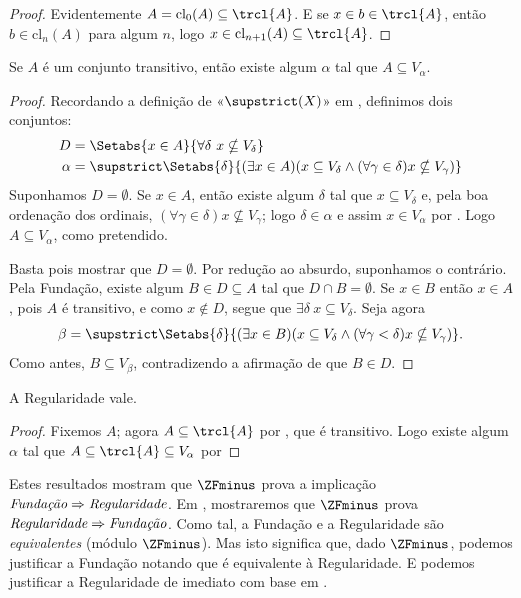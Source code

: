 \documentclass[../../../include/open-logic-section]{subfiles}
\begin{document}
\begin{proof}
Evidentemente $A = \text{cl}_0(A) \subseteq \trcl{A}$. E se $x
\in b \in \trcl{A}$, então $b \in \text{cl}_n(A)$ para algum $n$, logo $x
\in \text{cl}_{n+1}(A) \subseteq \trcl{A}$. 
\end{proof}

\begin{lem}
Se $A$ é um conjunto transitivo, então existe algum $\alpha$ tal que $A
\subseteq V_\alpha$.
\end{lem}

\begin{proof}
Recordando a definição de «$\supstrict(X)$» em
, definimos dois conjuntos:
\begin{align*}
	D  &= \Setabs{x \in A}{\forall \delta\ x \nsubseteq V_\delta}\\
	\alpha &= \supstrict\Setabs{\delta}{(\exists x \in A)
	(x \subseteq V_\delta \land (\forall \gamma \in \delta)x \nsubseteq V_\gamma)}
\end{align*}
Suponhamos $D = \emptyset$. Se $x \in A$, então existe algum $\delta$ tal que $x \subseteq V_\delta$ e, pela boa ordenação dos ordinais, $(\forall \gamma \in \delta)x \nsubseteq V_\gamma$; logo $\delta \in \alpha$ e assim $x \in V_\alpha$ por
. Logo $A \subseteq
V_{\alpha}$, como pretendido. 

Basta pois mostrar que $D = \emptyset$. Por redução ao absurdo, suponhamos
o contrário. Pela Fundação, existe algum $B \in D \subseteq A$ tal que $D \cap B
= \emptyset$. Se $x \in B$ então $x \in A$, pois $A$ é transitivo,
e como $x \notin D$, segue que $\exists \delta\ x \subseteq
V_\delta$. Seja agora
\[
	\beta = \supstrict\Setabs{\delta}{(\exists x \in B)(x \subseteq V_\delta \land (\forall \gamma < \delta)x \nsubseteq V_\gamma)}.
\]
Como antes, $B \subseteq V_\beta$, contradizendo a afirmação de que $B \in
D$.	
\end{proof}

\begin{thm}
A Regularidade vale.
\end{thm}

\begin{proof}
Fixemos $A$; agora $A \subseteq \trcl{A}$ por , que é transitivo. Logo existe algum $\alpha$ tal que $A \subseteq \trcl{A} \subseteq V_\alpha$ por 
\end{proof}

Estes resultados mostram que $\ZFminus$ prova a implicação
$\emph{Fundação}\Rightarrow\emph{Regularidade}$. Em
, mostraremos que
$\ZFminus$ prova $\emph{Regularidade}\Rightarrow\emph{Fundação}$. Como
tal, a Fundação e a Regularidade são \emph{equivalentes} (módulo
$\ZFminus$). Mas isto significa que, dado $\ZFminus$, podemos justificar a
Fundação notando que é equivalente à Regularidade. E podemos
justificar a Regularidade de imediato com base em \stageshier{}. 
\end{document}
